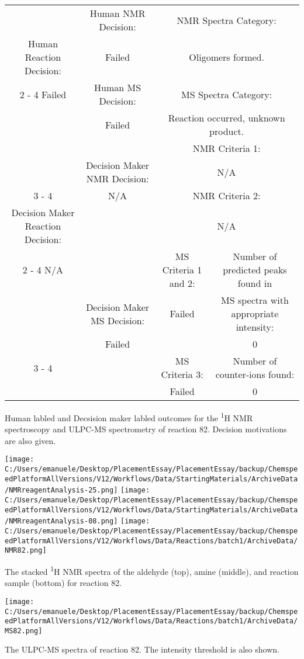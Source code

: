 \documentclass{article}%
\begin{document}
\begin{Decision Table}[H]%
\begin{tabular}{|c|c|c|c|}%
\hline%
&Human NMR Decision:&\multicolumn{2}{|c|}{NMR Spectra Category:}\\%
Human Reaction Decision:&Failed&\multicolumn{2}{|c|}{Oligomers formed.}\\%
\cline{2%
-%
4}%
Failed&Human MS Decision:&\multicolumn{2}{|c|}{MS Spectra Category:}\\%
&Failed&\multicolumn{2}{|c|}{Reaction occurred, unknown product.}\\%
\hline%
&&\multicolumn{2}{|c|}{NMR Criteria 1:}\\%
&Decision Maker NMR Decision:&\multicolumn{2}{|c|}{N/A}\\%
\cline{3%
-%
4}%
&N/A&\multicolumn{2}{|c|}{NMR Criteria 2:}\\%
Decision Maker Reaction Decision:&&\multicolumn{2}{|c|}{N/A}\\%
\cline{2%
-%
4}%
N/A&&MS Criteria 1 and 2:&Number of predicted peaks found in\\%
&Decision Maker MS Decision:&Failed&MS spectra with appropriate intensity:\\%
&Failed&&0\\%
\cline{3%
-%
4}%
&&MS Criteria 3:&Number of counter{-}ions found:\\%
&&Failed&0\\%
\hline%
\end{tabular}%
\caption{Human labled and Decsision maker labled outcomes for the \textsuperscript{1}H NMR spectroscopy and ULPC-MS spectrometry of reaction 82. Decision motivations are also given.}%
\end{Decision Table}%
\begin{NMR Spectra}[H]%
\begin{center}%
\texttt{[image: C:/Users/emanuele/Desktop/PlacementEssay/PlacementEssay/backup/ChemspeedPlatformAllVersions/V12/Workflows/Data/StartingMaterials/ArchiveData/NMRreagentAnalysis-25.png]}\hfill%
\texttt{[image: C:/Users/emanuele/Desktop/PlacementEssay/PlacementEssay/backup/ChemspeedPlatformAllVersions/V12/Workflows/Data/StartingMaterials/ArchiveData/NMRreagentAnalysis-08.png]}\hfill%
\texttt{[image: C:/Users/emanuele/Desktop/PlacementEssay/PlacementEssay/backup/ChemspeedPlatformAllVersions/V12/Workflows/Data/Reactions/batch1/ArchiveData/NMR82.png]}\hfill%
\end{center}%
\caption{The stacked \textsuperscript{1}H NMR spectra of the aldehyde (top), amine (middle), and reaction sample (bottom) for reaction 82.}%
\end{NMR Spectra}%
\begin{MS Spectra}[H]%
\begin{center}%
\texttt{[image: C:/Users/emanuele/Desktop/PlacementEssay/PlacementEssay/backup/ChemspeedPlatformAllVersions/V12/Workflows/Data/Reactions/batch1/ArchiveData/MS82.png]}\hfill%
\end{center}%
\caption{The ULPC-MS spectra of reaction 82. The intensity threshold is also shown.}%
\end{MS Spectra}%
\end{document}
